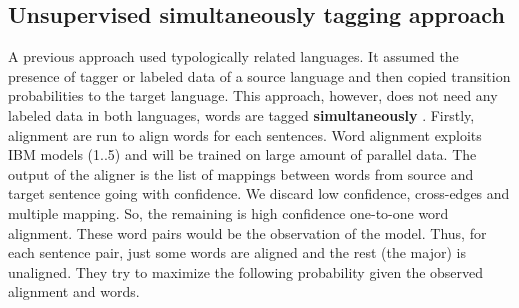 \subsection{Unsupervised simultaneously tagging approach}
A previous approach used typologically related languages. It assumed the presence of tagger or labeled data of a source language and then copied transition probabilities to the target language. This approach, however, does not need any labeled data in both languages, words are tagged \textbf{simultaneously} \cite{SnyderMultilingualPOS}. Firstly, alignment are run to align words for each sentences. Word alignment exploits IBM models (1..5) and will be trained on large amount of parallel data. The output of the aligner is the list of mappings between words from source and target sentence going with confidence. We discard low confidence, cross-edges and multiple mapping. So, the remaining is high confidence one-to-one word alignment. These word pairs would be the observation of the model. Thus, for each sentence pair, just some words are aligned and the rest (the major) is unaligned. They try to maximize the following probability given the observed alignment and words. 

